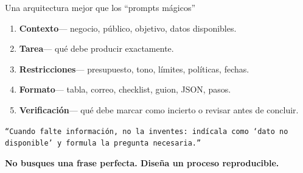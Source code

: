 \documentclass[aspectratio=169,11pt]{beamer}
\newcommand{\prompt}[1]{\texttt{\small #1}}
\begin{document}
\begin{frame}{Una arquitectura mejor que los “prompts mágicos”}
\vspace{0.10cm}
\begin{enumerate}
\item \textbf{Contexto}\;— negocio, público, objetivo, datos disponibles.
\item \textbf{Tarea}\;— qué debe producir exactamente.
\item \textbf{Restricciones}\;— presupuesto, tono, límites, políticas, fechas.
\item \textbf{Formato}\;— tabla, correo, checklist, guion, JSON, pasos.
\item \textbf{Verificación}\;— qué debe marcar como incierto o revisar antes de concluir.
\end{enumerate}

\vspace{0.55cm}
{\small\prompt{“Cuando falte información, no la inventes: indícala como ‘dato no disponible’ y formula la pregunta necesaria.”}}

\vfill
{\color{forest}\bfseries No busques una frase perfecta. Diseña un proceso reproducible.}
\end{frame}
\end{document}
